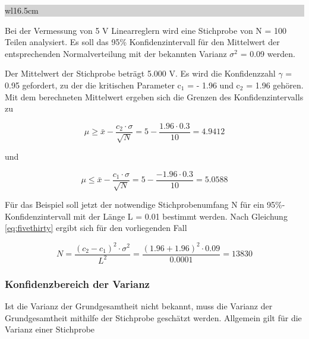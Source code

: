 \noindent
\colorbox{lightgray}{%
%
\renewcommand\arraystretch{0.6}%
\begin{tabular}{ wl{16.5cm} }
{\selectfont
{}}
\end{tabular}%
}\bigskip

\noindent Bei der Vermessung von 5 V Linearreglern wird eine Stichprobe von N = 100 Teilen analysiert. Es soll das 95\% Konfidenzintervall f\"{u}r den Mittelwert der entsprechenden Normalverteilung mit der bekannten Varianz $\sigma^{2}$ = 0.09 werden.

\noindent Der Mittelwert der Stichprobe betr\"{a}gt 5.000 V. Es wird die Konfidenzzahl $\gamma$ = 0.95 gefordert, zu der die kritischen Parameter c$_{1}$ = - 1.96 und c$_{2}$ = 1.96 geh\"{o}ren. Mit dem berechneten Mittelwert ergeben sich die Grenzen des Konfidenzintervalls zu

\begin{equation}\label{eq:fivethirtyone}
\mu \ge \bar{x}-\dfrac{c_{2} \cdot \sigma}{\sqrt{N}} =5-\dfrac{1.96\cdot 0.3}{10} = 4.9412
\end{equation}

\noindent und

\begin{equation}\label{eq:fivethirtytwo}
\mu \le \bar{x}-\dfrac{c_{1} \cdot \sigma}{\sqrt{N}} =5-\dfrac{-1.96\cdot 0.3}{10} = 5.0588
\end{equation}

\noindent F\"{u}r das Beispiel soll jetzt der notwendige Stichprobenumfang N f\"{u}r ein 95\%-Konfidenzintervall mit der L\"{a}nge L = 0.01 bestimmt werden. Nach Gleichung \eqref{eq:fivethirty} ergibt sich f\"{u}r den vorliegenden Fall

\begin{equation}\label{eq:fivethirtythree}
N=\dfrac{\left(c_{2} -c_{1} \right)^{2} \cdot \sigma ^{2} }{L^{2} } =\dfrac{\left(1.96+1.96\right)^{2} \cdot 0.09}{0.0001} = 13830
\end{equation}

\clearpage

\subsubsection{Konfidenzbereich der Varianz}

\noindent Ist die Varianz der Grundgesamtheit nicht bekannt, muss die Varianz der Grundgesamtheit mithilfe der Stichprobe gesch\"{a}tzt werden. Allgemein gilt f\"{u}r die Varianz einer Stichprobe 

